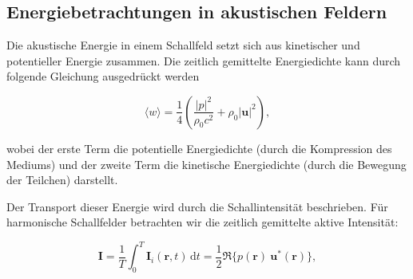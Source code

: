  
 
 

\subsection{Energiebetrachtungen in akustischen Feldern
\label{helmholtz:subsection:Energiebetrachtung}}

Die akustische Energie in einem Schallfeld setzt sich aus kinetischer und potentieller Energie zusammen. Die zeitlich gemittelte Energiedichte kann durch folgende Gleichung ausgedrückt werden

\begin{equation}
\langle w \rangle = \frac{1}{4}\left(\frac{|p|^2}{\rho_0 c^2} + \rho_0 |\mathbf{u}|^2 \right),
\end{equation}

\noindent wobei der erste Term die potentielle Energiedichte (durch die Kompression des Mediums) und der zweite Term die kinetische Energiedichte (durch die Bewegung der Teilchen) darstellt.

\noindent Der Transport dieser Energie wird durch die Schallintensität beschrieben. Für harmonische Schallfelder betrachten wir die zeitlich gemittelte aktive Intensität:

\begin{equation}
\mathbf{I} = \frac{1}{T}\int_0^T \mathbf{I}_i(\mathbf{r},t)\,\mathrm{d}t = \frac{1}{2}\Re\{p(\mathbf{r})~\mathbf{u}^*(\mathbf{r})\},
\end{equation}

